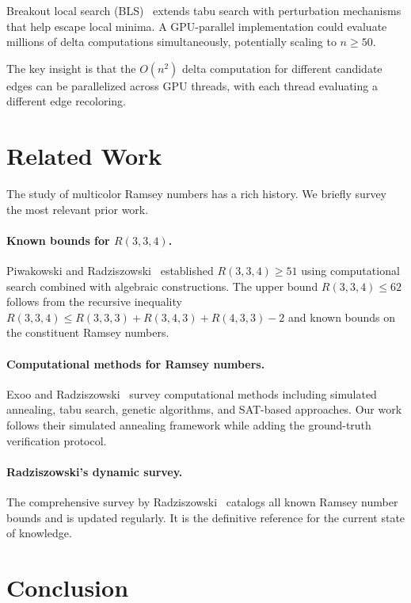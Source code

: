 \documentclass[11pt,a4paper]{article}
\theoremstyle{definition}
\theoremstyle{remark}
\begin{document}
Breakout local search (BLS)~\cite{Benlic2013} extends tabu search with
perturbation mechanisms that help escape local minima.
A GPU-parallel implementation could evaluate millions of delta
computations simultaneously, potentially scaling to $n \ge 50$.

The key insight is that the $O(n^2)$ delta computation for different
candidate edges can be parallelized across GPU threads, with each
thread evaluating a different edge recoloring.


\section{Related Work}\label{sec:related}

The study of multicolor Ramsey numbers has a rich history.
We briefly survey the most relevant prior work.

\paragraph{Known bounds for $R(3,3,4)$.}
Piwakowski and Radziszowski~\cite{Piwakowski2000} established
$R(3,3,4) \ge 51$ using computational search combined with algebraic
constructions.  The upper bound $R(3,3,4) \le 62$ follows from the
recursive inequality $R(3,3,4) \le R(3,3,3) + R(3,4,3) + R(4,3,3) - 2$
and known bounds on the constituent Ramsey numbers.

\paragraph{Computational methods for Ramsey numbers.}
Exoo and Radziszowski~\cite{Exoo2013} survey computational methods
including simulated annealing, tabu search, genetic algorithms, and
SAT-based approaches.  Our work follows their simulated annealing
framework while adding the ground-truth verification protocol.

\paragraph{Radziszowski's dynamic survey.}
The comprehensive survey by Radziszowski~\cite{Radziszowski2024}
catalogs all known Ramsey number bounds and is updated regularly.
It is the definitive reference for the current state of knowledge.


\section{Conclusion}\label{sec:conclusion}
\end{document}
